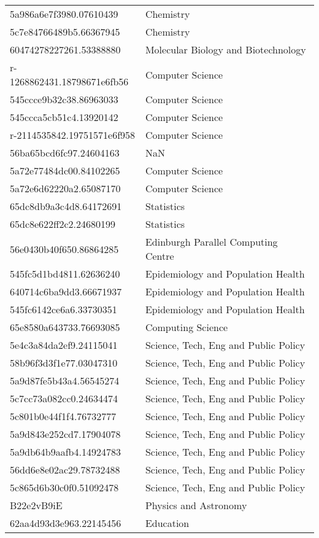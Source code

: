 \begin{tabular}{ll}
5a986a6e7f3980.07610439 & Chemistry \\
5c7e84766489b5.66367945 & Chemistry \\
60474278227261.53388880 & Molecular Biology and Biotechnology \\
r-1268862431.18798671e6fb56 & Computer Science \\
545ccce9b32c38.86963033 & Computer Science \\
545ccca5cb51c4.13920142 & Computer Science \\
r-2114535842.19751571e6f958 & Computer Science \\
56ba65bcd6fc97.24604163 & NaN \\
5a72e77484dc00.84102265 & Computer Science \\
5a72e6d62220a2.65087170 & Computer Science \\
65dc8db9a3c4d8.64172691 & Statistics \\
65dc8e622ff2c2.24680199 & Statistics \\
56e0430b40f650.86864285 & Edinburgh Parallel Computing Centre \\
545fc5d1bd4811.62636240 & Epidemiology and Population Health \\
640714c6ba9dd3.66671937 & Epidemiology and Population Health \\
545fc6142ce6a6.33730351 & Epidemiology and Population Health \\
65e8580a643733.76693085 & Computing Science \\
5e4c3a84da2ef9.24115041 & Science, Tech, Eng and Public Policy \\
58b96f3d3f1e77.03047310 & Science, Tech, Eng and Public Policy \\
5a9d87fe5b43a4.56545274 & Science, Tech, Eng and Public Policy \\
5c7cc73a082cc0.24634474 & Science, Tech, Eng and Public Policy \\
5c801b0e44f1f4.76732777 & Science, Tech, Eng and Public Policy \\
5a9d843e252cd7.17904078 & Science, Tech, Eng and Public Policy \\
5a9db64b9aafb4.14924783 & Science, Tech, Eng and Public Policy \\
56dd6e8e02ac29.78732488 & Science, Tech, Eng and Public Policy \\
5c865d6b30c0f0.51092478 & Science, Tech, Eng and Public Policy \\
B22e2vB9iE & Physics and Astronomy \\
62aa4d93d3e963.22145456 & Education \\

\end{tabular}
